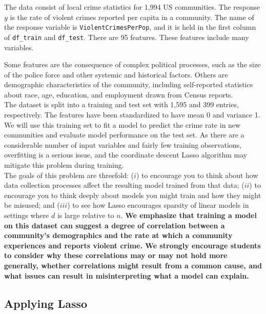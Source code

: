 \documentclass[shortlabels]{article}
\begin{document}
    The data consist of local crime statistics for 1,994 US communities. The response $y$ is the rate of violent crimes reported per capita in a community. The name of the response variable is \texttt{ViolentCrimesPerPop}, and it is held in the first column of \texttt{df\_train} and \texttt{df\_test}. There are 95 features. These
    features include many variables.

    Some features are the consequence of complex political processes, such as the size of the police force and other systemic and historical factors. Others are demographic
    characteristics of the community, including self-reported statistics about race, age, education, and employment drawn from Census reports.\\

    The dataset is split into a training and test set with 1,595 and 399 entries, respectively. The features have been standardized to have mean 0 and variance 1. 
    We will use this training set to fit a model to predict the crime rate in new communities and evaluate model performance on the test set.  As there are a considerable number of input variables and fairly few training observations, overfitting is a serious issue, and the coordinate descent Lasso algorithm may mitigate this problem during training. \\

    The goals of this problem are threefold: ($i$) to encourage you to think about how data collection processes affect the resulting model trained from that data; ($ii$) to encourage you to think deeply about models you might train and how they might be misused; and ($iii$) to see how Lasso encourages sparsity of linear models in settings where $d$ is large relative to $n$. \textbf{We emphasize that training a model on this dataset can suggest a degree of correlation between a community's demographics and the rate at which a community experiences and reports violent crime. We strongly encourage students to consider why these correlations may or may not hold more generally, whether correlations might result from a common cause, and what issues can result in misinterpreting what a model can explain.}\\

\newpage
\subsection*{Applying Lasso}
\end{document}
